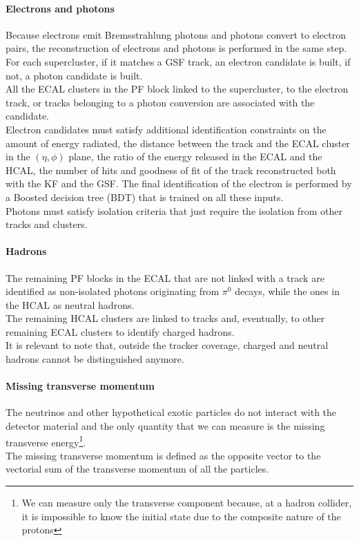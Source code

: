 \paragraph*{Electrons and photons}
Because electrons emit Bremsstrahlung photons and photons convert to electron pairs, the reconstruction of electrons and photons is performed in the same step.\\
For each supercluster, if it matches a GSF track, an electron candidate is built, if not, a photon candidate is built. \\
All the ECAL clusters in the PF block linked to the supercluster, to the electron track, or tracks belonging to a photon conversion are associated with the candidate.\\
Electron candidates must satisfy additional identification constraints on the amount of energy radiated, the distance between the track and the ECAL cluster in the $(\eta,\phi)$ plane, the ratio of the energy released in the ECAL and the HCAL, the number of hits and goodness of fit of the track reconstructed both with the KF and the GSF. The final identification of the electron is performed by a Boosted decision tree (BDT) that is trained on all these inputs.\\
Photons must satisfy isolation criteria that just require the isolation from other tracks and clusters.

\paragraph*{Hadrons}
The remaining PF blocks in the ECAL that are not linked with a track are identified as non-isolated photons originating from $\pi^0$ decays, while the ones in the HCAL as neutral hadrons.\\
The remaining HCAL clusters are linked to tracks and, eventually, to other remaining ECAL clusters to identify charged hadrons.\\
It is relevant to note that, outside the tracker coverage, charged and neutral hadrons cannot be distinguished anymore.

\paragraph*{Missing transverse momentum}
The neutrinos and other hypothetical exotic particles do not interact with the detector material and the only quantity that we can measure is the missing transverse energy\footnote{We can measure only the transverse component because, at a hadron collider, it is impossible to know the initial state due to the composite nature of the protons}.\\
The missing transverse momentum is defined as the opposite vector to the vectorial sum of the transverse momentum of all the particles.


